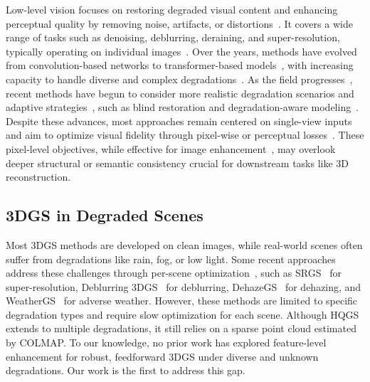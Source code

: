 \documentclass[letterpaper]{article} %
\begin{document}
Low-level vision focuses on restoring degraded visual content and enhancing perceptual quality by removing noise, artifacts, or distortions~\cite{li2024efficient,li2025dual,peng2021ensemble,li2023cross,ren2024ultrapixel,yan2025textual,Li2023FCDFusion2}. It covers a wide range of tasks such as denoising, deblurring, deraining, and super-resolution, typically operating on individual images~\cite{peng2020cumulative,wang2023decoupling,peng2024lightweight,peng2024towards,wang2023brightness,xiao2025incorporating,li2024efficient2,li2025fouriersr,Li_2025_CVPR,Li2023FCDFusion}. Over the years, methods have evolved from convolution-based networks to transformer-based models~\cite{yi2021structure,yi2021efficient,peng2024efficient,conde2024real,li2024object,he2024dual}, with increasing capacity to handle diverse and complex degradations~\cite{peng2025directing,yi2025fine,he2024latent,he2024diffusion,he2025segment,he2025unfoldir}. As the field progresses~\cite{peng2025pixel,peng2025boosting,xiao2025event,li2025ustc,he2024multi,qi2025data,feng2025pmq,ren2021deep,xia2024s3mamba,li2023ntire,ren2024ninth,wang2025ntire}, recent methods have begun to consider more realistic degradation scenarios and adaptive strategies~\cite{he2023hqg,ren2025turbo2k,li2025frequency,zhao2024boosting,peng2024unveiling,he2025run,he2025reti,zheng2024odtrack,jin2024mipi,sun2024beyond}, such as blind restoration and degradation-aware modeling~\cite{ren2025triplane,ren2023towards,xiao2024event,zheng2023toward,di2025qmambabsr,ren2022dlformer,du2024fc3dnet}. Despite these advances, most approaches remain centered on single-view inputs and aim to optimize visual fidelity through pixel-wise or perceptual losses~\cite{li2024uniformly,zhao2023spike,zheng2022leveraging,gong2024beyond,zeng2024cross}. These pixel-level objectives, while effective for image enhancement~\cite{li2024loop,zheng2025decoupled,zheng2025towards,pan2025enhance,wu2025dropout,jiang2024dalpsr,ignatov2025rgb,gong2022person,lin2025phys4dgen}, may overlook deeper structural or semantic consistency crucial for downstream tasks like 3D reconstruction.


\subsection{3DGS in Degraded Scenes}

Most 3DGS methods are developed on clean images, while real-world scenes often suffer from degradations like rain, fog, or low light. Some recent approaches address these challenges through per-scene optimization~\cite{jin2024lighting,qiao2025restorgs,bui2025mobgs}, such as SRGS~\cite{feng2024srgs} for super-resolution, Deblurring 3DGS~\cite{lee2024deblurring} for deblurring, DehazeGS~\cite{ma2025dehazegs} for dehazing, and WeatherGS~\cite{qian2024weathergs} for adverse weather. However, these methods are limited to specific degradation types and require slow optimization for each scene. Although HQGS~\cite{linhqgs} extends to multiple degradations, it still relies on a sparse point cloud estimated by COLMAP. To our knowledge, no prior work has explored feature-level enhancement for robust, feedforward 3DGS under diverse and unknown degradations. Our work is the first to address this gap.
\end{document}
